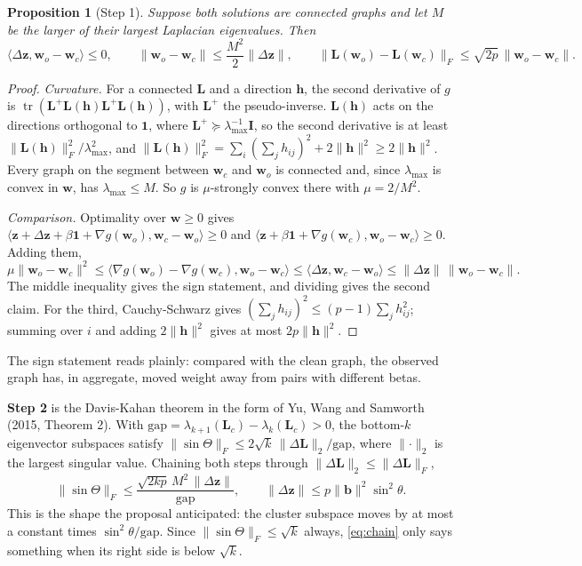 \documentclass[11pt,a4paper]{article}
\newcommand{\Lap}{\mathbf{L}}
\newcommand{\Imat}{\mathbf{I}}
\newcommand{\bvec}{\mathbf{b}}
\newcommand{\wvec}{\mathbf{w}}
\newcommand{\zvec}{\mathbf{z}}
\newcommand{\one}{\mathbf{1}}
\newcommand{\tr}{\operatorname{tr}}
\newtheorem{proposition}{Proposition}
\theoremstyle{remark}
\begin{document}
\begin{proposition}[Step 1]\label{prop:step1}
Suppose both solutions are connected graphs and let $M$ be the larger of their largest
Laplacian eigenvalues. Then
\[
  \langle\Delta\zvec,\wvec_o-\wvec_c\rangle\le0,\qquad
  \lVert\wvec_o-\wvec_c\rVert\le\frac{M^2}{2}\lVert\Delta\zvec\rVert,\qquad
  \lVert\Lap(\wvec_o)-\Lap(\wvec_c)\rVert_F\le\sqrt{2p}\,\lVert\wvec_o-\wvec_c\rVert .
\]
\end{proposition}
\begin{proof}
\emph{Curvature.} For a connected $\Lap$ and a direction $\mathbf h$, the second
derivative of $g$ is $\tr(\Lap^+\Lap(\mathbf h)\Lap^+\Lap(\mathbf h))$, with $\Lap^+$ the
pseudo-inverse. $\Lap(\mathbf h)$ acts on the directions orthogonal to $\one$, where
$\Lap^+\succeq\lambda_{\max}^{-1}\Imat$, so the second derivative is at least
$\lVert\Lap(\mathbf h)\rVert_F^2/\lambda_{\max}^2$, and
$\lVert\Lap(\mathbf h)\rVert_F^2=\sum_i(\sum_jh_{ij})^2+2\lVert\mathbf h\rVert^2\ge
2\lVert\mathbf h\rVert^2$. Every graph on the segment between $\wvec_c$ and $\wvec_o$ is
connected and, since $\lambda_{\max}$ is convex in $\wvec$, has $\lambda_{\max}\le M$.
So $g$ is $\mu$-strongly convex there with $\mu=2/M^2$.

\emph{Comparison.} Optimality over $\wvec\ge0$ gives
$\langle\zvec+\Delta\zvec+\beta\one+\nabla g(\wvec_o),\wvec_c-\wvec_o\rangle\ge0$ and
$\langle\zvec+\beta\one+\nabla g(\wvec_c),\wvec_o-\wvec_c\rangle\ge0$. Adding them,
\[
  \mu\lVert\wvec_o-\wvec_c\rVert^2\le\langle\nabla g(\wvec_o)-\nabla g(\wvec_c),\wvec_o-\wvec_c\rangle
  \le\langle\Delta\zvec,\wvec_c-\wvec_o\rangle\le\lVert\Delta\zvec\rVert\,\lVert\wvec_o-\wvec_c\rVert .
\]
The middle inequality gives the sign statement, and dividing gives the second claim.
For the third, Cauchy-Schwarz gives $(\sum_jh_{ij})^2\le(p-1)\sum_jh_{ij}^2$; summing
over $i$ and adding $2\lVert\mathbf h\rVert^2$ gives at most $2p\lVert\mathbf h\rVert^2$.
\end{proof}

The sign statement reads plainly: compared with the clean graph, the observed graph has,
in aggregate, moved weight away from pairs with different betas.

\textbf{Step 2} is the Davis-Kahan theorem in the form of Yu, Wang and Samworth (2015,
Theorem 2). With $\mathrm{gap}=\lambda_{k+1}(\Lap_c)-\lambda_k(\Lap_c)>0$, the bottom-$k$
eigenvector subspaces satisfy
$\lVert\sin\Theta\rVert_F\le2\sqrt k\,\lVert\Delta\Lap\rVert_2/\mathrm{gap}$, where
$\lVert\cdot\rVert_2$ is the largest singular value. Chaining both steps through
$\lVert\Delta\Lap\rVert_2\le\lVert\Delta\Lap\rVert_F$,
\begin{equation}\label{eq:chain}
  \lVert\sin\Theta\rVert_F\le\frac{\sqrt{2kp}\,M^2\,\lVert\Delta\zvec\rVert}{\mathrm{gap}},
  \qquad\lVert\Delta\zvec\rVert\le p\lVert\bvec\rVert^2\sin^2\theta .
\end{equation}
This is the shape the proposal anticipated: the cluster subspace moves by at most a
constant times $\sin^2\theta/\mathrm{gap}$. Since $\lVert\sin\Theta\rVert_F\le\sqrt k$
always, \eqref{eq:chain} only says something when its right side is below $\sqrt k$.
\end{document}
